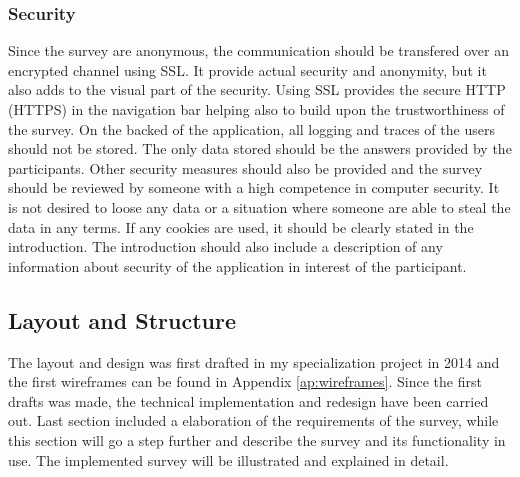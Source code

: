     \subsubsection*{Security}
      Since the survey are anonymous, the communication should be transfered over an encrypted channel using SSL. It provide actual security and anonymity, but it also adds to the visual part of the security. Using SSL provides the secure HTTP (HTTPS) in the navigation bar helping also to build upon the trustworthiness of the survey.
      On the backed of the application, all logging and traces of the users should not be stored. The only data stored should be the answers provided by the participants. 
      Other security measures should also be provided and the survey should be reviewed by someone with a high competence in computer security. It is not desired to loose any data or a situation where someone are able to steal the data in any terms.
      If any cookies are used, it should be clearly stated in the introduction. The introduction should also include a description of any information about security of the application in interest of the participant.


	\subsection{Layout and Structure}

    The layout and design was first drafted in my specialization project in 2014 and the first wireframes can be found in Appendix \ref{ap:wireframes}. Since the first drafts was made, the technical implementation and redesign have been carried out. Last section included a elaboration of the requirements of the survey, while this section will go a step further and describe the survey and its functionality in use. The implemented survey will be illustrated and explained in detail. 

